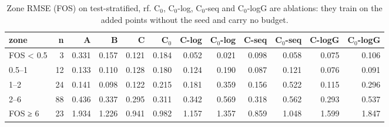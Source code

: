 \begin{table}[htbp]
\centering
\small
\setlength{\tabcolsep}{4pt}
\caption{Zone RMSE (FOS) on test-stratified, rf. C$_0$, C$_0$-log, C$_0$-seq and C$_0$-logG are ablations: they train on the added points without the seed and carry no budget.}
\label{tab:test-stratified__log-rmse:zones:rf}
\begin{tabular}{lrrrrrrrrrrr}
\toprule
zone & n & A & B & C & C$_0$ & C-log & C$_0$-log & C-seq & C$_0$-seq & C-logG & C$_0$-logG \\
\midrule
FOS < 0.5 & 3 & 0.331 & 0.157 & 0.121 & 0.184 & 0.052 & 0.021 & 0.098 & 0.058 & 0.075 & 0.106 \\
0.5–1 & 12 & 0.133 & 0.110 & 0.128 & 0.180 & 0.124 & 0.190 & 0.087 & 0.121 & 0.076 & 0.091 \\
1–2 & 24 & 0.141 & 0.098 & 0.122 & 0.215 & 0.181 & 0.359 & 0.156 & 0.522 & 0.115 & 0.296 \\
2–6 & 88 & 0.436 & 0.337 & 0.295 & 0.311 & 0.342 & 0.569 & 0.318 & 0.562 & 0.293 & 0.537 \\
FOS ≥ 6 & 23 & 1.934 & 1.226 & 0.941 & 0.982 & 1.157 & 1.357 & 0.859 & 1.048 & 1.599 & 1.847 \\
\bottomrule
\end{tabular}
\end{table}
